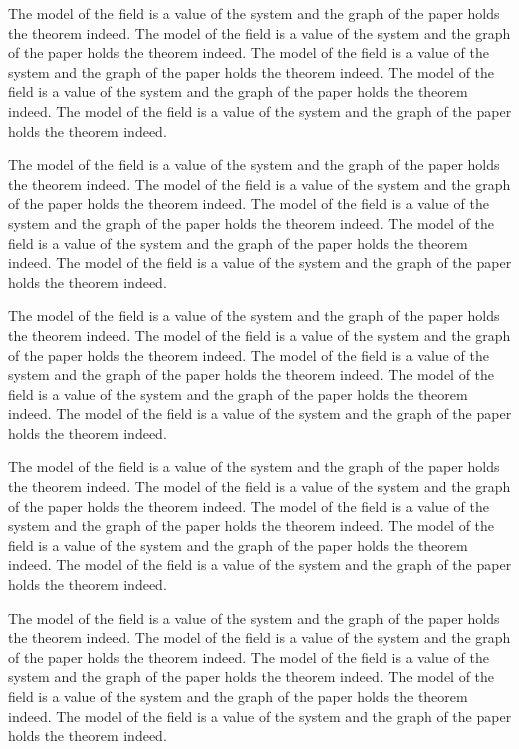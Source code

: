 \documentclass{article}
\begin{document}
The model of the field is a value of the system and the graph of the paper holds the theorem indeed. The model of the field is a value of the system and the graph of the paper holds the theorem indeed. The model of the field is a value of the system and the graph of the paper holds the theorem indeed. The model of the field is a value of the system and the graph of the paper holds the theorem indeed. The model of the field is a value of the system and the graph of the paper holds the theorem indeed.

The model of the field is a value of the system and the graph of the paper holds the theorem indeed. The model of the field is a value of the system and the graph of the paper holds the theorem indeed. The model of the field is a value of the system and the graph of the paper holds the theorem indeed. The model of the field is a value of the system and the graph of the paper holds the theorem indeed. The model of the field is a value of the system and the graph of the paper holds the theorem indeed.

The model of the field is a value of the system and the graph of the paper holds the theorem indeed. The model of the field is a value of the system and the graph of the paper holds the theorem indeed. The model of the field is a value of the system and the graph of the paper holds the theorem indeed. The model of the field is a value of the system and the graph of the paper holds the theorem indeed. The model of the field is a value of the system and the graph of the paper holds the theorem indeed.

The model of the field is a value of the system and the graph of the paper holds the theorem indeed. The model of the field is a value of the system and the graph of the paper holds the theorem indeed. The model of the field is a value of the system and the graph of the paper holds the theorem indeed. The model of the field is a value of the system and the graph of the paper holds the theorem indeed. The model of the field is a value of the system and the graph of the paper holds the theorem indeed.

The model of the field is a value of the system and the graph of the paper holds the theorem indeed. The model of the field is a value of the system and the graph of the paper holds the theorem indeed. The model of the field is a value of the system and the graph of the paper holds the theorem indeed. The model of the field is a value of the system and the graph of the paper holds the theorem indeed. The model of the field is a value of the system and the graph of the paper holds the theorem indeed.
\end{document}
